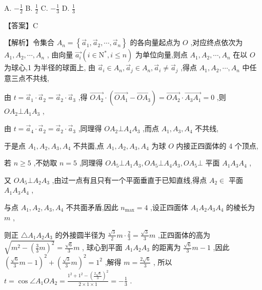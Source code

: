 \documentclass[10pt]{article}
\begin{document}
A. \(- \frac{1}{2}\) B. \(\frac{1}{2}\) C. \(- \frac{1}{3}\) D. \(\frac{1}{3}\)

【答案】C

【解析】令集合 \({A}_{n} = \left\{  {{\overrightarrow{a}}_{1},{\overrightarrow{a}}_{2},\cdots ,{\overrightarrow{a}}_{n}}\right\}\) 的各向量起点为 \(O\) ,对应终点依次为 \({A}_{1},{A}_{2},\cdots ,{A}_{n}\) , 由向量 \(\overrightarrow{{a}_{i}}\left( {i \in  {\mathrm{N}}^{ * },i \leq  n}\right)\) 为单位向量,则点 \({A}_{1},{A}_{2},\cdots ,{A}_{n}\) 在以 \(O\) 为球心,1 为半径的球面上, 由 \({\overrightarrow{a}}_{i} \in  {A}_{n},{\overrightarrow{a}}_{j} \in  {A}_{n},{\overrightarrow{a}}_{i} \neq  {\overrightarrow{a}}_{j}\) ,得点 \({A}_{1},{A}_{2},\cdots ,{A}_{n}\) 中任意三点不共线,

由 \(t = {\overrightarrow{a}}_{1} \cdot  {\overrightarrow{a}}_{2} = {\overrightarrow{a}}_{2} \cdot  {\overrightarrow{a}}_{3}\) ,得 \(\overrightarrow{O{A}_{2}} \cdot  \left( {\overrightarrow{O{A}_{1}} - \overrightarrow{O{A}_{3}}}\right)  = \overrightarrow{O{A}_{2}} \cdot  \overrightarrow{{A}_{3}{A}_{1}} = 0\) ,则 \(O{A}_{2} \bot  {A}_{1}{A}_{3}\) ,

由 \(t = {\overrightarrow{a}}_{4} \cdot  {\overrightarrow{a}}_{2} = {\overrightarrow{a}}_{2} \cdot  {\overrightarrow{a}}_{3}\) ,同理得 \(O{A}_{2} \bot  {A}_{4}{A}_{3}\) ,而点 \({A}_{1},{A}_{3},{A}_{4}\) 不共线,

于是点 \({A}_{1},{A}_{2},{A}_{3},{A}_{4}\) 不共面,点 \({A}_{1},{A}_{2},{A}_{3},{A}_{4}\) 为球 \(O\) 内接正四面体的 4 个顶点,

若 \(n \geq  5\) ,不妨取 \(n = 5\) ,同理得 \(O{A}_{5} \bot  {A}_{1}{A}_{3},O{A}_{5} \bot  {A}_{4}{A}_{3},O{A}_{5} \bot\) 平面 \({A}_{1}{A}_{3}{A}_{4}\) ,

又 \(O{A}_{5} \bot  {A}_{2}{A}_{3}\) ,由过一点有且只有一个平面垂直于已知直线,得点 \({A}_{2} \in\) 平面 \({A}_{1}{A}_{3}{A}_{4}\) ,

与点 \({A}_{1},{A}_{2},{A}_{3},{A}_{4}\) 不共面矛盾,因此 \({n}_{\max } = 4\) ,设正四面体 \({A}_{1}{A}_{2}{A}_{3}{A}_{4}\) 的棱长为 \(m\) ,

则正 \(\bigtriangleup {A}_{1}{A}_{2}{A}_{3}\) 的外接圆半径为 \(\frac{\sqrt{3}}{2}m \cdot  \frac{2}{3} = \frac{\sqrt{3}}{3}m\) ,正四面体的高为 \(\sqrt{{m}^{2} - {\left( \frac{3}{3}m\right) }^{2}} = \frac{\sqrt{6}}{3}m\) , 球心到平面 \({A}_{1}{A}_{2}{A}_{3}\) 的距离为 \(\frac{\sqrt{6}}{3}m - 1\) ,因此 \({\left( \frac{\sqrt{6}}{3}m - 1\right) }^{2} + {\left( \frac{\sqrt{3}}{3}m\right) }^{2} = {1}^{2}\) ,解得 \(m = \frac{2\sqrt{6}}{3}\) , 所以 \(t = \cos \angle {A}_{1}O{A}_{2} = \frac{{1}^{2} + {1}^{2} - {\left( \frac{2\sqrt{6}}{3}\right) }^{2}}{2 \times  1 \times  1} =  - \frac{1}{3}\) .
\end{document}
